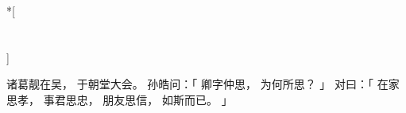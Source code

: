
\switchcolumn[0]*[\section{}]

诸葛靓在吴，
于朝堂大会。
孙皓问：「
    卿字仲思，
    为何所思？
」
对曰：「
    在家思孝，
    事君思忠，
    朋友思信，
    如斯而已。
」

\switchcolumn



